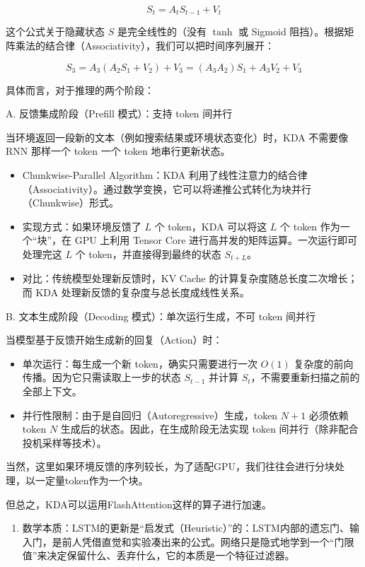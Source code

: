 \[
S_t=A_tS_{t-1}+V_t
\]

这个公式关于隐藏状态 \(S\) 是完全线性的（没有 \(\tanh\) 或 Sigmoid 阻挡）。根据矩阵乘法的结合律（Associativity），我们可以把时间序列展开：

\[
S_3=A_3(A_2S_1+V_2)+V_3=(A_3A_2)S_1+A_3V_2+V_3
\]

具体而言，对于推理的两个阶段：

A. 反馈集成阶段（Prefill 模式）：支持 token 间并行

当环境返回一段新的文本（例如搜索结果或环境状态变化）时，KDA 不需要像 RNN 那样一个 token 一个 token 地串行更新状态。

\begin{itemize}
\tightlist
\item
  Chunkwise-Parallel Algorithm：KDA 利用了线性注意力的结合律（Associativity）。通过数学变换，它可以将递推公式转化为块并行（Chunkwise）形式。
\item
  实现方式：如果环境反馈了 \(L\) 个 token，KDA 可以将这 \(L\) 个 token 作为一个``块''，在 GPU 上利用 Tensor Core 进行高并发的矩阵运算。一次运行即可处理完这 \(L\) 个 token，并直接得到最终的状态 \(S_{t+L}\)。
\item
  对比：传统模型处理新反馈时，KV Cache 的计算复杂度随总长度二次增长；而 KDA 处理新反馈的复杂度与总长度成线性关系。
\end{itemize}

B. 文本生成阶段（Decoding 模式）：单次运行生成，不可 token 间并行

当模型基于反馈开始生成新的回复（Action）时：

\begin{itemize}
\tightlist
\item
  单次运行：每生成一个新 token，确实只需要进行一次 \(O(1)\) 复杂度的前向传播。因为它只需读取上一步的状态 \(S_{t-1}\) 并计算 \(S_t\)，不需要重新扫描之前的全部上下文。
\item
  并行性限制：由于是自回归（Autoregressive）生成，token \(N+1\) 必须依赖 token \(N\) 生成后的状态。因此，在生成阶段无法实现 token 间并行（除非配合投机采样等技术）。
\end{itemize}

当然，这里如果环境反馈的序列较长，为了适配GPU，我们往往会进行分块处理，以一定量token作为一个块。

但总之，KDA可以运用FlashAttention这样的算子进行加速。

\begin{enumerate}
\def\labelenumi{\arabic{enumi}.}
\setcounter{enumi}{2}
\tightlist
\item
  数学本质：LSTM的更新是``启发式（Heuristic）''的：LSTM内部的遗忘门、输入门，是前人凭借直觉和实验凑出来的公式。网络只是隐式地学到一个``门限值''来决定保留什么、丢弃什么，它的本质是一个特征过滤器。
\end{enumerate}

